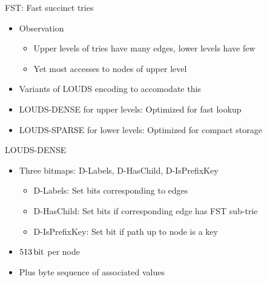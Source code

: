\documentclass{beamer}
\begin{document}
\begin{frame}{FST: Fast succinct tries}
		\begin{itemize}
				\item Observation
						\begin{itemize}
								\item Upper levels of tries have many edges, lower levels have few
								\item Yet most accesses to nodes of upper level
						\end{itemize}
				\item Variants of LOUDS encoding
						\autocite{jacobsonSpaceefficientStaticTrees1989} to
						accomodate this
				\item LOUDS-DENSE for upper levels: Optimized for fast lookup
				\item LOUDS-SPARSE for lower levels: Optimized for compact storage
		\end{itemize}
\end{frame}

\begin{frame}{LOUDS-DENSE}
		\begin{itemize}
				\item Three bitmaps: D-Labels, D-HasChild, D-IsPrefixKey
						\begin{itemize}
								\item D-Labels: Set bits corresponding to edges
								\item D-HasChild: Set bits if corresponding edge has FST sub-trie
								\item D-IsPrefixKey: Set bit if path up to node is a key
						\end{itemize}
				\item $\qty{513}{\bit}$ per node
				\item Plus byte sequence of associated values
		\end{itemize}
\end{frame}
\end{document}

